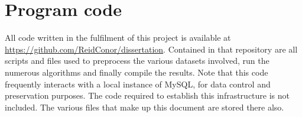 %
%
%
%

\chapter{Program code}\label{C.Appendix2}
All code written in the fulfilment of this project is available at \url{https://github.com/ReidConor/dissertation}. Contained in that repository are all scripts and files used to preprocess the various datasets involved, run the numerous algorithms and finally compile the results. Note that this code frequently interacts with a local instance of MySQL, for data control and preservation purposes. The code required to establish this infrastructure is not included. The various files that make up this document are stored there also.  